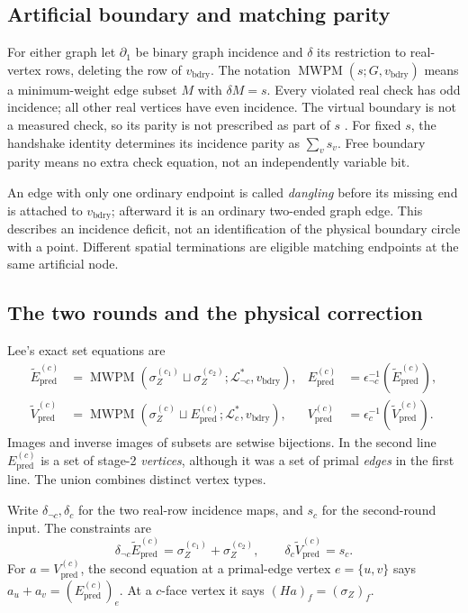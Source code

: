 \documentclass[11pt]{article}
\theoremstyle{definition}
\theoremstyle{plain}
\theoremstyle{remark}
\newcommand{\LL}{\mathcal L}
\newcommand{\bd}{v_{\mathrm{bdry}}}
\newcommand{\eps}{\epsilon}
\newcommand{\pred}{\mathrm{pred}}
\newcommand{\MWPM}{\operatorname{MWPM}}
\begin{document}
\subsection{Artificial boundary and matching parity}
For either graph let $\partial_1$ be binary graph incidence and
$\delta$ its restriction to real-vertex rows, deleting the row of $\bd$.
The notation $\MWPM(s;G,\bd)$ means a minimum-weight edge subset $M$
with $\delta M=s$. Every violated real check has odd incidence; all
other real vertices have even incidence. The virtual boundary is
not a measured check, so its parity is not prescribed as part of $s$
\cite[Sec.~2.2, p.~4]{Lee}.
For fixed $s$, the handshake identity determines its incidence parity
as $\sum_v s_v$. Free boundary parity means no extra check equation,
not an independently variable bit.

An edge with only one ordinary endpoint is called \emph{dangling}
before its missing end is attached to $\bd$; afterward it is an
ordinary two-ended graph edge. This describes an incidence deficit,
not an identification of the physical boundary circle with a point.
Different spatial terminations are eligible matching endpoints at
the same artificial node.

\subsection{The two rounds and the physical correction}\label{sec:rounds}
Lee's exact set equations are
\begin{align}
 \widetilde E_{\pred}^{(c)}
 &=\MWPM(\sigma_Z^{(c_1)}\sqcup\sigma_Z^{(c_2)};
                 \LL_{\neg c}^*,\bd),&
 E_{\pred}^{(c)}
 &=\eps_{\neg c}^{-1}(\widetilde E_{\pred}^{(c)}),
 \label{eq:round1}\\
 \widetilde V_{\pred}^{(c)}
 &=\MWPM(\sigma_Z^{(c)}\sqcup E_{\pred}^{(c)};
                 \LL_c^*,\bd),&
 V_{\pred}^{(c)}
 &=\eps_c^{-1}(\widetilde V_{\pred}^{(c)}).
 \label{eq:round2}
\end{align}
Images and inverse images of subsets are setwise bijections.
In the second line $E_{\pred}^{(c)}$ is a set of stage-2 \emph{vertices},
although it was a set of primal \emph{edges} in the first line.
The union combines distinct vertex types.

Write $\delta_{\neg c},\delta_c$ for the two real-row incidence maps,
and $s_c$ for the second-round input. The constraints are
\[
 \delta_{\neg c}\widetilde E_{\pred}^{(c)}
   =\sigma_Z^{(c_1)}+\sigma_Z^{(c_2)},\qquad
 \delta_c\widetilde V_{\pred}^{(c)}=s_c.
\]
For $a=V_{\pred}^{(c)}$, the second equation at a primal-edge vertex
$e=\{u,v\}$ says $a_u+a_v=(E_{\pred}^{(c)})_e$.
At a $c$-face vertex it says $(Ha)_f=(\sigma_Z)_f$.
\end{document}
